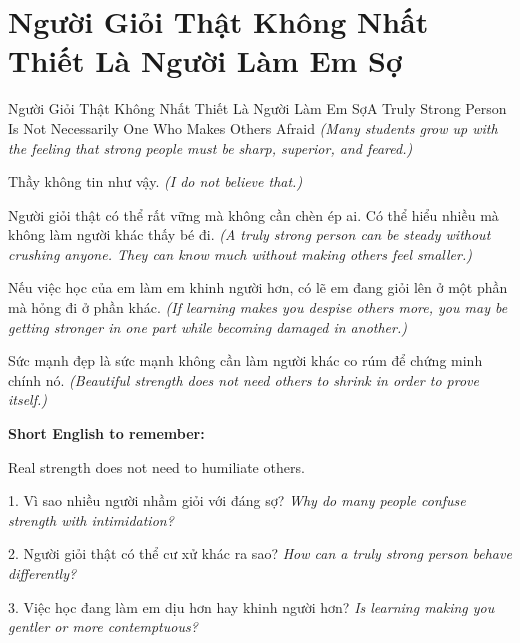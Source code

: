 \section{Người Giỏi Thật Không Nhất Thiết Là Người Làm Em Sợ}
\begin{truyen}{Người Giỏi Thật Không Nhất Thiết Là Người Làm Em Sợ}{A Truly Strong Person Is Not Necessarily One Who Makes Others Afraid}
\textit{(Many students grow up with the feeling that strong people must be sharp, superior, and feared.)}

Thầy không tin như vậy.
\textit{(I do not believe that.)}

Người giỏi thật có thể rất vững mà không cần chèn ép ai. Có thể hiểu nhiều mà không làm người khác thấy bé đi.
\textit{(A truly strong person can be steady without crushing anyone. They can know much without making others feel smaller.)}

Nếu việc học của em làm em khinh người hơn, có lẽ em đang giỏi lên ở một phần mà hỏng đi ở phần khác.
\textit{(If learning makes you despise others more, you may be getting stronger in one part while becoming damaged in another.)}
\end{truyen}

\begin{baihoc}
Sức mạnh đẹp là sức mạnh không cần làm người khác co rúm để chứng minh chính nó.
\textit{(Beautiful strength does not need others to shrink in order to prove itself.)}
\end{baihoc}

\begin{ghinhoanh}
\textbf{Short English to remember:}

Real strength does not need to humiliate others.

\end{ghinhoanh}

\begin{tuhocnhanh}
1. Vì sao nhiều người nhầm giỏi với đáng sợ? \textit{Why do many people confuse strength with intimidation?}

2. Người giỏi thật có thể cư xử khác ra sao? \textit{How can a truly strong person behave differently?}

3. Việc học đang làm em dịu hơn hay khinh người hơn? \textit{Is learning making you gentler or more contemptuous?}
\end{tuhocnhanh}
\ngancach

